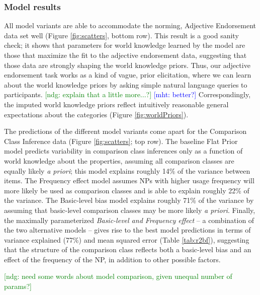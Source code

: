 \documentclass[doc]{apa6}
\newcommand{\ndg}[1]{\textcolor{Green}{[ndg: #1]}}
\newcommand{\mht}[1]{\textcolor{Blue}{[mht: #1]}}
\begin{document}
\subsubsection{Model results}%
All model variants are able to accommodate the norming, Adjective Endorsement data set well (Figure \ref{fig:scatters}, bottom row).
This result is a good sanity check; it shows that parameters for world knowledge learned by the model are those that maximize the fit to the adjective endorsement data, suggesting that those data are strongly shaping the world knowledge priors.
 Thus, our adjective endorsement task works as a kind of vague, prior elicitation, where we can learn about the world knowledge priors by asking simple natural language queries to participants. 
  \ndg{explain that a little more...?} \mht{better?}
Correspondingly, the imputed world knowledge priors reflect intuitively reasonable general expectations about the categories (Figure \ref{fig:worldPriors}).

The predictions of the different model variants come apart for the Comparison Class Inference data (Figure \ref{fig:scatters}; top row).
The baseline Flat Prior model predicts variability in comparison class inferences only as a function of world knowledge about the properties, assuming all comparison classes are equally likely \emph{a priori}; this model explains roughly 14\% of the variance between items.
The Frequency effect model assumes NPs with higher usage frequency will more likely be used as comparison classes and is able to explain roughly 22\% of the variance.
The Basic-level bias model explains roughly 71\% of the variance by assuming that basic-level comparison classes may be more likely \emph{a priori}.
Finally, the maximally parameterized \emph{Basic-level and Frequency effect} -- a combination of the two alternative models -- gives rise to the best model predictions in terms of variance explained (77\%) and mean squared error (Table \ref{tab:r2bf}), suggesting that the structure of the comparison class reflects both a basic-level bias and an effect of the frequency of the NP, in addition to other possible factors.

\ndg{need some words about model comparison, given unequal number of params?}
\end{document}
